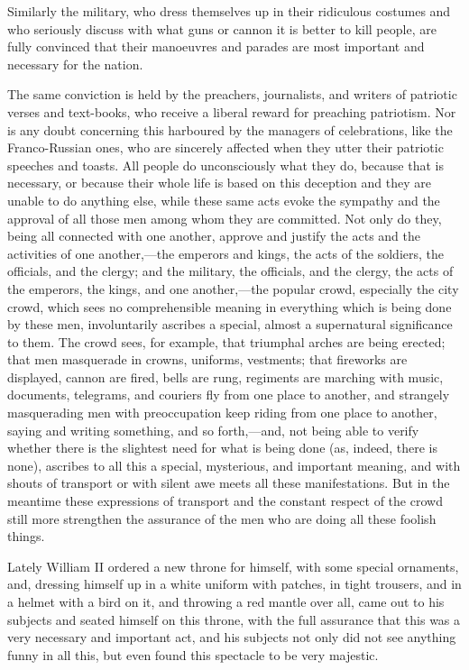 \documentclass{book}
\begin{document}
Similarly the military, who dress themselves up in their ridiculous costumes and who seriously discuss with what guns or cannon it is better to kill people, are fully convinced that their manoeuvres and parades are most important and necessary for the nation.

The same conviction is held by the preachers, journalists, and writers of patriotic verses and text-books, who receive a liberal reward for preaching patriotism. Nor is any doubt concerning this harboured by the managers of celebrations, like the Franco-Russian ones, who are sincerely affected when they utter their patriotic speeches and toasts. All people do unconsciously what they do, because that is necessary, or because their whole life is based on this deception and they are unable to do anything else, while these same acts evoke the sympathy and the approval of all those men among whom they are committed. Not only do they, being all connected with one another, approve and justify the acts and the activities of one another,—the emperors and kings, the acts of the soldiers, the officials, and the clergy; and the military, the officials, and the clergy, the acts of the emperors, the kings, and one another,—the popular crowd, especially the city crowd, which sees no comprehensible meaning in everything which is being done by these men, involuntarily ascribes a special, almost a supernatural significance to them. The crowd sees, for example, that triumphal arches are being erected; that men masquerade in crowns, uniforms, vestments; that fireworks are displayed, cannon are fired, bells are rung, regiments are marching with music, documents, telegrams, and couriers fly from one place to another, and strangely masquerading men with preoccupation keep riding from one place to another, saying and writing something, and so forth,—and, not being able to verify whether there is the slightest need for what is being done (as, indeed, there is none), ascribes to all this a special, mysterious, and important meaning, and with shouts of transport or with silent awe meets all these manifestations. But in the meantime these expressions of transport and the constant respect of the crowd still more strengthen the assurance of the men who are doing all these foolish things.

Lately William II ordered a new throne for himself, with some special ornaments, and, dressing himself up in a white uniform with patches, in tight trousers, and in a helmet with a bird on it, and throwing a red mantle over all, came out to his subjects and seated himself on this throne, with the full assurance that this was a very necessary and important act, and his subjects not only did not see anything funny in all this, but even found this spectacle to be very majestic.
\end{document}
